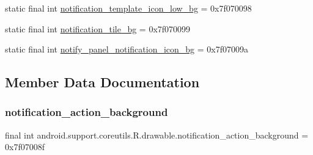 \begin{DoxyCompactItemize}
\item 
static final int \mbox{\hyperlink{classandroid_1_1support_1_1coreutils_1_1R_1_1drawable_a403b56ac85ecd42e8800e902613bf438}{notification\+\_\+template\+\_\+icon\+\_\+low\+\_\+bg}} = 0x7f070098
\item 
static final int \mbox{\hyperlink{classandroid_1_1support_1_1coreutils_1_1R_1_1drawable_a6108983b4bcd3db6cd2fd8814a20d1b9}{notification\+\_\+tile\+\_\+bg}} = 0x7f070099
\item 
static final int \mbox{\hyperlink{classandroid_1_1support_1_1coreutils_1_1R_1_1drawable_a052e2e692f5581a2fcda2ae98607764b}{notify\+\_\+panel\+\_\+notification\+\_\+icon\+\_\+bg}} = 0x7f07009a
\end{DoxyCompactItemize}


\subsection{Member Data Documentation}
\mbox{\label{classandroid_1_1support_1_1coreutils_1_1R_1_1drawable_a1e0e57eea57123962ada4e4e23c7f87f}} 
\subsubsection{\texorpdfstring{notification\+\_\+action\+\_\+background}{notification\_action\_background}}
{\footnotesize\ttfamily final int android.\+support.\+coreutils.\+R.\+drawable.\+notification\+\_\+action\+\_\+background = 0x7f07008f\hspace{0.3cm}{\ttfamily [static]}}

\mbox{\label{classandroid_1_1support_1_1coreutils_1_1R_1_1drawable_a86831aa5308e6938123b94a9c4d3a35b}} 
